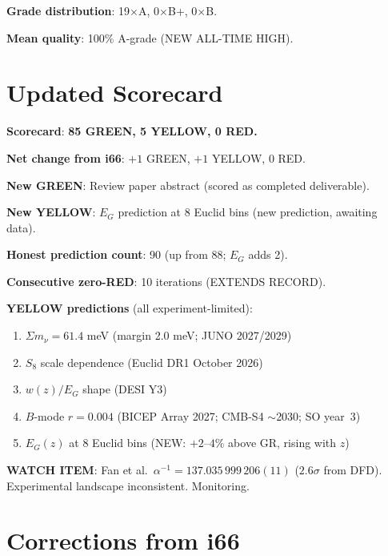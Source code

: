 \documentclass[11pt,a4paper]{article}
\newcommand{\GREEN}{\textcolor{dfdgreen}{\textbf{GREEN}}}
\newcommand{\YELLOW}{\textcolor{dfdyellow}{\textbf{YELLOW}}}
\newcommand{\RED}{\textcolor{dfdred}{\textbf{RED}}}
\begin{document}
\textbf{Grade distribution}: 19$\times$A, 0$\times$B+, 0$\times$B.

\textbf{Mean quality}: 100\% A-grade (NEW ALL-TIME HIGH).


\section{Updated Scorecard}
\label{sec:scorecard}

\textbf{Scorecard}: \textbf{85 \GREEN, 5 \YELLOW, 0 \RED.}

\textbf{Net change from i66}: $+1$ GREEN, $+1$ YELLOW, $0$ RED.

\textbf{New GREEN}: Review paper abstract (scored as completed deliverable).

\textbf{New YELLOW}: $E_G$ prediction at 8 Euclid bins (new prediction, awaiting data).

\textbf{Honest prediction count}: 90 (up from 88; $E_G$ adds 2).

\textbf{Consecutive zero-RED}: 10 iterations (EXTENDS RECORD).

\textbf{YELLOW predictions} (all experiment-limited):
\begin{enumerate}
\item $\Sigma m_\nu = 61.4$ meV (margin 2.0 meV; JUNO 2027/2029)
\item $S_8$ scale dependence (Euclid DR1 October 2026)
\item $w(z)/E_G$ shape (DESI Y3)
\item $B$-mode $r = 0.004$ (BICEP Array 2027; CMB-S4 $\sim$2030; SO year~3)
\item $E_G(z)$ at 8 Euclid bins (NEW: $+2$--$4\%$ above GR, rising with $z$)
\end{enumerate}

\textbf{WATCH ITEM}: Fan et al.\ $\alpha^{-1} = 137.035\,999\,206(11)$ ($2.6\sigma$ from DFD). Experimental landscape inconsistent. Monitoring.


\section{Corrections from i66}
\label{sec:corrections}
\end{document}
